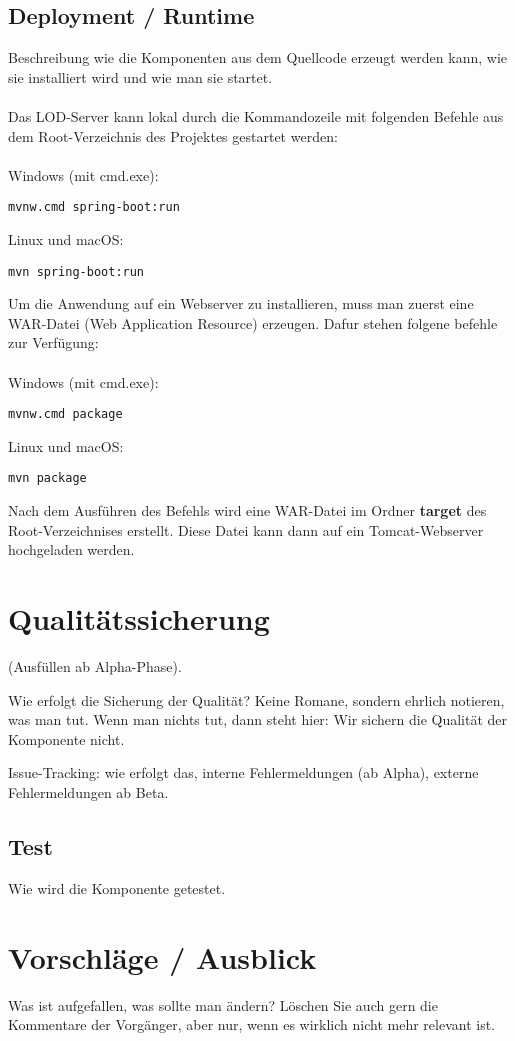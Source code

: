\subsection{Deployment / Runtime}
Beschreibung wie die Komponenten aus dem Quellcode erzeugt werden kann,
wie sie installiert wird und wie man sie startet.\\
\\
Das LOD-Server kann lokal durch die Kommandozeile mit folgenden Befehle aus 
dem Root-Verzeichnis des Projektes gestartet werden:\\
\\
Windows (mit cmd.exe):
\begin{lstlisting}
mvnw.cmd spring-boot:run
\end{lstlisting}
Linux und macOS:
\begin{lstlisting}
mvn spring-boot:run
\end{lstlisting}
\vspace{5mm}
\noindent
Um die Anwendung auf ein Webserver zu installieren, muss man zuerst eine WAR-Datei 
(Web Application Resource) erzeugen. Dafur stehen folgene befehle zur Verfügung: \\
\\
Windows (mit cmd.exe):
\begin{lstlisting}
mvnw.cmd package
\end{lstlisting}
\vspace{5mm}
\noindent
Linux und macOS:
\begin{lstlisting}
mvn package
\end{lstlisting}
\vspace{5mm}
\noindent
Nach dem Ausführen des Befehls wird eine WAR-Datei im Ordner \textbf{target} 
des Root-Verzeichnises erstellt. Diese Datei kann dann auf ein Tomcat-Webserver
hochgeladen werden.


\section{Qualitätssicherung}
(Ausfüllen ab Alpha-Phase).

Wie erfolgt die Sicherung der Qualität? Keine Romane, sondern ehrlich notieren,
was man tut. Wenn man nichts tut, dann steht hier: Wir sichern die Qualität der
Komponente nicht.

Issue-Tracking: wie erfolgt das, interne Fehlermeldungen (ab Alpha), 
externe Fehlermeldungen ab Beta.

\subsection{Test}
Wie wird die Komponente getestet.

\section{Vorschläge / Ausblick}
Was ist aufgefallen, was sollte man ändern? Löschen Sie auch gern die Kommentare
der Vorgänger, aber nur, wenn es wirklich nicht mehr relevant ist.

